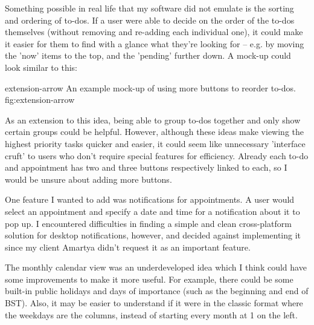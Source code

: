 Something possible in real life that my software did not emulate is the sorting
and ordering of to-dos. If a user were able to decide on the order of the to-dos
themselves (without removing and re-adding each individual one), it could make
it easier for them to find with a glance what they're looking for -- e.g. by
moving the 'now' items to the top, and the 'pending' further down. A mock-up
could look similar to this:

\addsmallfigure
    {extension-arrow}
    {An example mock-up of using more buttons to reorder to-dos.}
    {fig:extension-arrow}

As an extension to this idea, being able to group to-dos together and only show
certain groups could be helpful. However, although these ideas make viewing the
highest priority tasks quicker and easier, it could seem like unnecessary
'interface cruft' to users who don't require special features for efficiency.
Already each to-do and appointment has two and three buttons respectively linked
to each, so I would be unsure about adding more buttons.

One feature I wanted to add was notifications for appointments. A user would
select an appointment and specify a date and time for a notification about
it to pop up. I encountered difficulties in finding a simple and clean
cross-platform solution for desktop notifications, however, and decided against
implementing it since my client Amartya didn't request it as an important
feature.

The monthly calendar view was an underdeveloped idea which I think could have
some improvements to make it more useful. For example, there could be some
built-in public holidays and days of importance (such as the beginning and end
of BST). Also, it may be easier to understand if it were in the classic format
where the weekdays are the columns, instead of starting every month at 1 on the
left.
